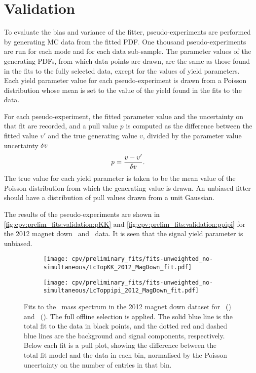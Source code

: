 \section{Validation}
\label{chap:cpv:prelim_fits:validation}

To evaluate the bias and variance of the fitter, pseudo-experiments are 
performed by generating \ac{MC} data from the fitted \ac{PDF}.
One thousand pseudo-experiments are run for each mode and for each data 
sub-sample.
The parameter values of the generating \acp{PDF}, from which data points are 
drawn, are the same as those found in the fits to the fully selected data, 
except for the values of yield parameters.
Each yield parameter value for each pseudo-experiment is drawn from a Poisson 
distribution whose mean is set to the value of the yield found in the fits to 
the data.

For each pseudo-experiment, the fitted parameter value and the uncertainty on 
that fit are recorded, and a pull value $p$ is computed as the difference 
between the fitted value $v'$ and the true generating value $v$, divided by the 
parameter value uncertainty $\delta{v}$
\begin{equation}
  p = \frac{v - v'}{\delta{v}}.
\end{equation}
The true value for each yield parameter is taken to be the mean value of the 
Poisson distribution from which the generating value is drawn.
An unbiased fitter should have a distribution of pull values drawn from a unit 
Gaussian.

The results of the pseudo-experiments are shown in 
\cref{fig:cpv:prelim_fits:validation:pKK} and 
\cref{fig:cpv:prelim_fits:validation:ppipi} for the 2012 magnet down \pKK\ and 
\ppipi\ data.
It is seen that the signal yield parameter is unbiased.

\begin{figure}
  \begin{subfigure}[b]{0.5\textwidth}
    \texttt{[image: cpv/preliminary\_fits/fits-unweighted\_no-simultaneous/LcTopKK\_2012\_MagDown\_fit.pdf]}
    \caption{\pKK}
    \label{fig:cpv:prelim_fits:full:pKK}
  \end{subfigure}
  \begin{subfigure}[b]{0.5\textwidth}
    \texttt{[image: cpv/preliminary\_fits/fits-unweighted\_no-simultaneous/LcToppipi\_2012\_MagDown\_fit.pdf]}
    \caption{\ppipi}
    \label{fig:cpv:prelim_fits:full:ppipi}
  \end{subfigure}
  \caption{%
    Fits to the \PLambdac\ mass spectrum in the 2012 magnet down dataset for 
    \pKK~() and 
    \ppipi~().
    The full offline selection is applied.
    The solid blue line is the total fit to the data in black points, and the 
    dotted red and dashed blue lines are the background and signal components, 
    respectively.
    Below each fit is a pull plot, showing the difference between the total fit 
    model and the data in each bin, normalised by the Poisson uncertainty on 
    the number of entries in that bin.
  }
  \label{fig:cpv:prelim_fits:full}
\end{figure}

